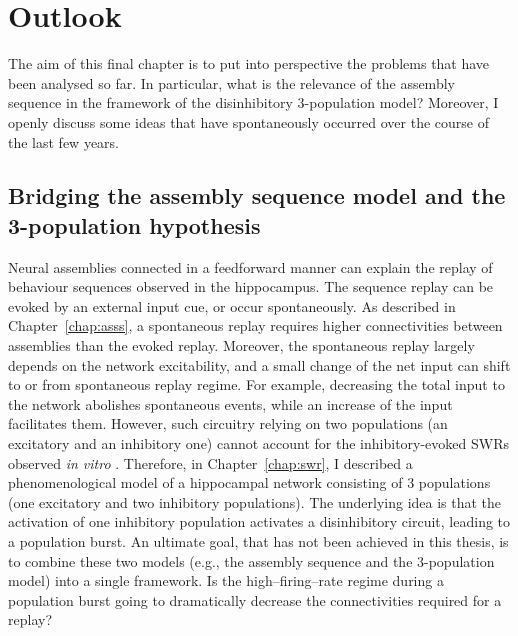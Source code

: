 \chapter{Outlook}
  The aim of this final chapter is to put into perspective the problems that
  have been analysed so far. In particular, what is the relevance of the
  assembly sequence in the framework of the disinhibitory 3-population model?
  Moreover, I openly discuss some ideas that have spontaneously occurred over
  the course of the last few years.

\section{Bridging the assembly sequence model and the 3-population hypothesis}
  Neural assemblies connected in a feedforward manner can explain the replay of
  behaviour sequences observed in the hippocampus. The sequence replay can be
  evoked by an external input cue, or occur spontaneously. As described in
  Chapter~\ref{chap:asss}, a spontaneous replay requires higher connectivities
  between assemblies than the evoked replay. Moreover, the spontaneous replay
  largely depends on the network excitability, and a small change of the net
  input can shift to or from spontaneous replay regime. For example, decreasing
  the total input to the network abolishes spontaneous events, while an
  increase of the input facilitates them. However, such circuitry relying on
  two populations (an excitatory and an inhibitory one) cannot account for the
  inhibitory-evoked SWRs observed \textit{in vitro}
  \citep[e.g.,][]{Schlingloff2014, Kohus2016}. Therefore, in
  Chapter~\ref{chap:swr}, I described a phenomenological model of a hippocampal
  network consisting of 3 populations (one excitatory and two inhibitory
  populations). The underlying idea is that the activation of one inhibitory
  population activates a disinhibitory circuit, leading to a population burst.
  An ultimate goal, that has not been achieved in this thesis, is to combine
  these two models (e.g., the assembly sequence and the 3-population model)
  into a single framework. Is the high--firing--rate regime during a population
  burst going to dramatically decrease the connectivities required for a
  replay?

